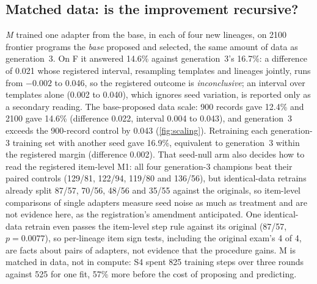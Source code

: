 \subsection{Matched data: is the improvement recursive?}\label{sec:matched}

\emph{M} trained one adapter from the base, in each of four new lineages, on 2100 frontier programs the
\emph{base} proposed and selected, the same amount of data as generation~3. On F it answered 14.6\%
against generation~3's 16.7\%: a difference of 0.021 whose registered interval, resampling templates and
lineages jointly, runs from $-0.002$ to 0.046, so the registered outcome is \emph{inconclusive}; an
interval over templates alone (0.002 to 0.040), which ignores seed variation, is reported only as a
secondary reading. The base-proposed data scale: 900 records gave 12.4\% and 2100 gave 14.6\%
(difference 0.022, interval 0.004 to 0.043), and generation~3 exceeds the 900-record control by 0.043
(\cref{fig:scaling}). Retraining each generation-3 training set with another seed gave 16.9\%,
equivalent to generation~3 within the registered margin (difference 0.002). That seed-null arm
also decides how to read the registered item-level M1: all four generation-3 champions beat their paired
controls (129/81, 122/94, 119/80 and 136/56), but identical-data retrains already split 87/57, 70/56,
48/56 and 35/55 against the originals, so item-level comparisons of single adapters measure seed noise
as much as treatment and are not evidence here, as the registration's amendment anticipated.
One identical-data retrain even passes the item-level step rule against its original (87/57,
$p=0.0077$), so per-lineage item sign tests, including the original exam's 4 of 4, are facts about pairs
of adapters, not evidence that the procedure gains.
M is matched in data, not in compute: S4 spent 825 training steps over three rounds against 525 for one
fit, 57\% more before the cost of proposing and predicting.

\begin{table}[tbp]
\centering\small

\caption{Every model examined on the fresh exam F (2340 items, direct-completion protocol unless noted;
S4 and control rows are means of four lineages). The last three rows are the examiner's descriptive
baselines, with no criterion; the thinking-on figure is a lower bound, because 372 replies ran out of
their 8192-token budget while thinking.}\label{tab:fresh}
\end{table}


